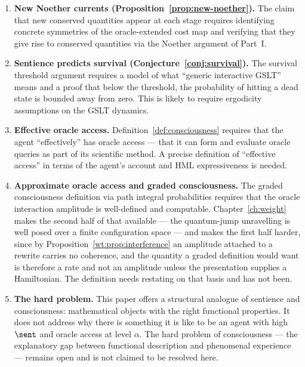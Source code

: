 \begin{enumerate}[label=\textbf{Gap \arabic*.}, leftmargin=*, itemsep=8pt]
  \item \textbf{New Noether currents (Proposition~\ref{prop:new-noether}).}
        The claim that new conserved quantities appear at each
        stage requires identifying concrete symmetries of the
        oracle-extended cost map and verifying that they give
        rise to conserved quantities via the Noether argument of
        Part~I.

  \item \textbf{Sentience predicts survival
        (Conjecture~\ref{conj:survival}).}
        The survival threshold argument requires a model of what
        ``generic interactive GSLT'' means and a proof that below
        the threshold, the probability of hitting a dead state
        is bounded away from zero.
        This is likely to require ergodicity assumptions on the
        GSLT dynamics.

  \item \textbf{Effective oracle access.}
        Definition~\ref{def:consciousness} requires that the agent
        ``effectively'' has oracle access --- that it can form and
        evaluate oracle queries as part of its scientific method.
        A precise definition of ``effective access'' in terms of
        the agent's account and HML expressiveness is needed.

  \item \textbf{Approximate oracle access and graded consciousness.}
        The graded consciousness definition via path integral
        probabilities requires that the oracle interaction amplitude
        is well-defined and computable.
        Chapter~\ref{ch:weight} makes the second half of that
        available --- the quantum-jump unravelling is well posed over
        a finite configuration space --- and makes the first half
        harder, since by
        Proposition~\ref{wt:prop:interference} an amplitude
        attached to a rewrite carries no coherence, and the
        quantity a graded definition would want is therefore a rate
        and not an amplitude unless the presentation supplies a
        Hamiltonian.  The definition needs restating on that basis
        and has not been.

  \item \textbf{The hard problem.}
        This paper offers a structural analogue of sentience and
        consciousness: mathematical objects with the right
        functional properties.
        It does not address why there is something it is like to
        be an agent with high $\sent$ and oracle access at level
        $\alpha$.
        The hard problem of consciousness --- the explanatory gap
        between functional description and phenomenal experience
        --- remains open and is not claimed to be resolved here.

\end{enumerate}

